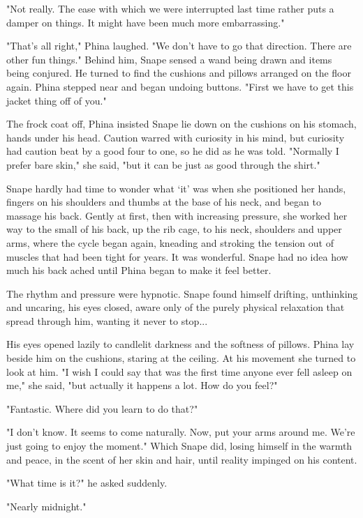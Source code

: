 \documentclass[a4paper,11pt]{article}
\begin{document}
"Not really. The ease with which we were interrupted last time rather puts a damper on things. It might have been much more embarrassing."

"That's all right," Phina laughed. "We don't have to go that direction. There are other fun things." Behind him, Snape sensed a wand being drawn and items being conjured. He turned to find the cushions and pillows arranged on the floor again. Phina stepped near and began undoing buttons. "First we have to get this jacket thing off of you."

The frock coat off, Phina insisted Snape lie down on the cushions on his stomach, hands under his head. Caution warred with curiosity in his mind, but curiosity had caution beat by a good four to one, so he did as he was told. "Normally I prefer bare skin," she said, "but it can be just as good through the shirt."

Snape hardly had time to wonder what `it' was when she positioned her hands, fingers on his shoulders and thumbs at the base of his neck, and began to massage his back. Gently at first, then with increasing pressure, she worked her way to the small of his back, up the rib cage, to his neck, shoulders and upper arms, where the cycle began again, kneading and stroking the tension out of muscles that had been tight for years. It was wonderful. Snape had no idea how much his back ached until Phina began to make it feel better.

The rhythm and pressure were hypnotic. Snape found himself drifting, unthinking and uncaring, his eyes closed, aware only of the purely physical relaxation that spread through him, wanting it never to stop...

His eyes opened lazily to candlelit darkness and the softness of pillows. Phina lay beside him on the cushions, staring at the ceiling. At his movement she turned to look at him. "I wish I could say that was the first time anyone ever fell asleep on me," she said, "but actually it happens a lot. How do you feel?"

"Fantastic. Where did you learn to do that?"

"I don't know. It seems to come naturally. Now, put your arms around me. We're just going to enjoy the moment." Which Snape did, losing himself in the warmth and peace, in the scent of her skin and hair, until reality impinged on his content.

"What time is it?" he asked suddenly.

"Nearly midnight."
\end{document}
